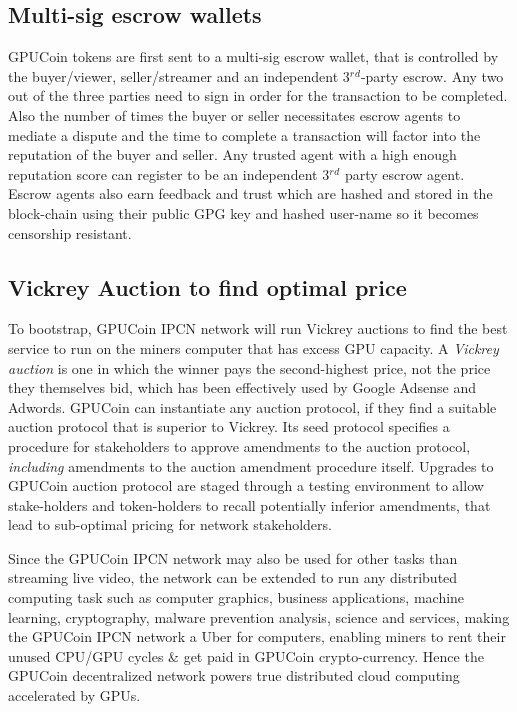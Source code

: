 \documentclass{article}
\begin{document}
\subsection{Multi-sig escrow wallets}
GPUCoin tokens are first sent to a multi-sig escrow wallet, that is controlled by the buyer/viewer, seller/streamer and an independent 3$^r$$^d$-party escrow. Any two out of the three parties need to sign in order for the transaction to be completed. Also the number of times the buyer or seller necessitates escrow agents to mediate a dispute and the time to complete a transaction will factor into the reputation of the buyer and seller. Any trusted agent with a high enough reputation score can register to be an independent 3$^r$$^d$ party escrow agent. Escrow agents also earn feedback and trust which are hashed and stored in the block-chain using their public GPG key and hashed user-name so it becomes censorship resistant.

\subsection{Vickrey Auction to find optimal price}
To bootstrap, GPUCoin IPCN network will run Vickrey auctions to find the best service to run on the miners computer that has excess GPU capacity. A \emph{Vickrey auction} is one in which the winner pays the second-highest price, not the price they themselves bid, which has been effectively used by Google Adsense and Adwords.
GPUCoin can instantiate any auction protocol, if they find a suitable auction protocol that is superior to Vickrey. Its seed protocol specifies a procedure for stakeholders to approve amendments to the auction protocol, \emph{including} amendments to the auction amendment procedure itself. Upgrades to GPUCoin auction protocol are staged through a testing environment to allow stake-holders and token-holders to recall potentially inferior amendments, that lead to sub-optimal pricing for network stakeholders. 

Since the GPUCoin IPCN network may also be used for other tasks than streaming live video, the network can be extended to run any distributed computing task such as computer graphics, business applications, machine learning, cryptography, malware prevention analysis, science and services, making the GPUCoin IPCN network a Uber for computers, enabling miners to rent their unused CPU/GPU cycles \& get paid in GPUCoin crypto-currency. Hence the GPUCoin decentralized network powers true distributed cloud computing accelerated by GPUs.
\end{document}
